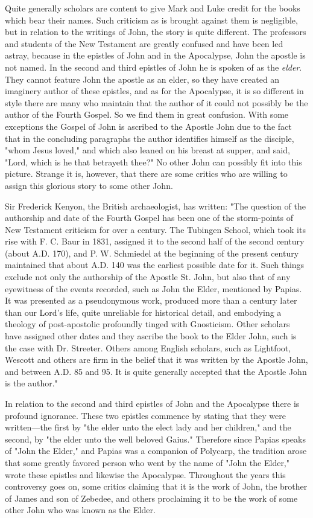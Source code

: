 Quite generally scholars are content to give Mark and Luke credit for the books which bear
their names. Such criticism as is brought against them is negligible, but in relation to the
writings of John, the story is quite different. The professors and students of the New
Testament are greatly confused and have been led astray, because in the epistles of John and
in the Apocalypse, John the apostle is not named. In the second and third epistles of John he
is spoken of as the \textit{elder}. They cannot feature John the apostle as an elder, so they have
created an imaginery author of these epistles, and as for the Apocalypse, it is so different in
style there are many who maintain that the author of it could not possibly be the author of the
Fourth Gospel. So we find them in great confusion. With some exceptions the Gospel of John
is ascribed to the Apostle John due to the fact that in the concluding paragraphs the author
identifies himself as the disciple, "whom Jesus loved," and which also leaned on his breast at
supper, and said, "Lord, which is he that betrayeth thee?" No other John can possibly fit into
this picture. Strange it is, however, that there are some critics who are willing to assign this
glorious story to some other John.

Sir Frederick Kenyon, the British archaeologist, has written: "The question of the authorship
and date of the Fourth Gospel has been one of the storm-points of New Testament criticism
for over a century. The Tubingen School, which took its rise with F. C. Baur in 1831,
assigned it to the second half of the second century (about A.D. 170), and P. W. Schmiedel at
the beginning of the present century maintained that about A.D. 140 was the earliest possible
date for it. Such things exclude not only the authorship of the Apostle St. John, but also that
of any eyewitness of the events recorded, such as John the Elder, mentioned by Papias. It was
presented as a pseudonymous work, produced more than a century later than our Lord's life,
quite unreliable for historical detail, and embodying a theology of post-apostolic profoundly
tinged with Gnosticism. Other scholars have assigned other dates and they ascribe the book
to the Elder John, such is the case with Dr. Streeter. Others among English scholars, such as
Lightfoot, Wescott and others are firm in the belief that it was written by the Apostle John,
and between A.D. 85 and 95. It is quite generally accepted that the Apostle John is the
author."

In relation to the second and third epistles of John and the Apocalypse there is profound
ignorance. These two epistles commence by stating that they were written—the first by "the
elder unto the elect lady and her children," and the second, by "the elder unto the well
beloved Gaius." Therefore since Papias speaks of "John the Elder," and Papias was a
companion of Polycarp, the tradition arose that some greatly favored person who went by the
name of "John the Elder," wrote these epistles and likewise the Apocalypse. Throughout the
years this controversy goes on, some critics claiming that it is the work of John, the brother
of James and son of Zebedee, and others proclaiming it to be the work of some other John
who was known as the Elder.

